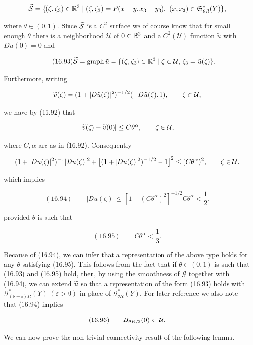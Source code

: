 \[
\widetilde{\mathcal{S}} = \{(\zeta, \zeta_3) \in \mathbb{R}^3 \mid (\zeta, \zeta_3) = P(x - y, x_3 - y_3),\ (x, x_3) \in \mathfrak{S}_{\theta R}^*(Y)\},
\]

where $\theta \in (0, 1)$. Since $\widetilde{\mathcal{S}}$ is a $C^2$ surface we of course know that for small enough $\theta$ there is a neighborhood $\mathcal U$ of $0 \in \mathbb{R}^2$ and a $C^2(\mathcal U)$ function $\tilde u$ with $D\tilde u(0) = 0$ and

\begin{equation}
\tag{16.93}
\widetilde{\mathcal{S}} = \operatorname{graph}\tilde u = \{(\zeta, \zeta_3) \in \mathbb{R}^3 \mid \zeta \in \mathcal U,\, \zeta_3 = \tilde u(\zeta)\}.
\end{equation}

Furthermore, writing

\[
\widetilde{v}(\zeta) = (1 + |D\tilde u(\zeta)|^2)^{-1/2}(-D\tilde u(\zeta), 1), \qquad \zeta \in \mathcal U,
\]



\pagestyle{empty}



we have by (16.92) that

\[
|\widetilde{v}(\zeta)-\widetilde{v}(0)| \le C\theta^\alpha, \qquad \zeta\in\mathcal{U},
\]

where $C,\alpha$ are as in (16.92). Consequently

\[
(1+|Du(\zeta)|^2)^{-1}|Du(\zeta)|^2+\bigl[(1+|Du(\zeta)|^2)^{-1/2}-1\bigr]^2\le (C\theta^\alpha)^2,\qquad \zeta\in\mathcal{U}.
\]

which implies

\[
(16.94)\qquad |Du(\zeta)|\le [1-(C\theta^\alpha)^2]^{-1/2}C\theta^\alpha<\frac12.
\]

provided $\theta$ is such that

\[
(16.95)\qquad C\theta^\alpha<\frac13.
\]

Because of (16.94), we can infer that a representation of the above type holds for any $\theta$ satisfying (16.95). This follows from the fact that if $\theta\in(0,1)$ is such that (16.93) and (16.95) hold, then, by using the smoothness of $\mathscr G$ together with (16.94), we can extend $\widetilde{u}$ so that a representation of the form (16.93) holds with $\mathscr G^{*}_{(\theta+\varepsilon)R}(Y)$ $(\varepsilon>0)$ in place of $\mathscr G^{*}_{\theta R}(Y)$. For later reference we also note that (16.94) implies

\[
(16.96)\qquad B_{\theta R/2}(0)\subset \mathcal{U}.
\]

We can now prove the non-trivial connectivity result of the following lemma.

